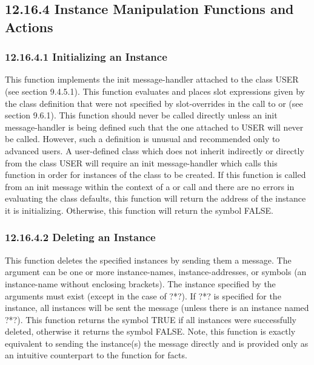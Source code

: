 \documentclass[letterpaper,10pt,english]{sphinxmanual}
\begin{document}
\subsection{12.16.4 Instance Manipulation Functions and Actions}
\label{\detokenize{actions:instance-manipulation-functions-and-actions}}

\subsubsection{12.16.4.1 Initializing an Instance}
\label{\detokenize{actions:initializing-an-instance}}
This function implements the init message-handler attached to the class
USER (see section 9.4.5.1). This function evaluates and places slot
expressions given by the class definition that were not specified by
slot-overrides in the call to  or
 (see section 9.6.1). This function should never
be called directly unless an init message-handler is being defined such
that the one attached to USER will never be called. However, such a
definition is unusual and recommended only to advanced users. A
user-defined class which does not inherit indirectly or directly from
the class USER will require an init message-handler which calls this
function in order for instances of the class to be created. If this
function is called from an init message within the context of a
 or  call and there are no
errors in evaluating the class defaults, this function will return the
address of the instance it is initializing. Otherwise, this function
will return the symbol FALSE.


\begin{sphinxVerbatim}[commandchars=\\\{\}]
\end{sphinxVerbatim}


\subsubsection{12.16.4.2 Deleting an Instance}
\label{\detokenize{actions:deleting-an-instance}}
This function deletes the specified instances by sending them a
 message. The argument can be one or more instance-names,
instance-addresses, or symbols (an instance-name without enclosing
brackets). The instance specified by the arguments must exist (except in
the case of ?*?). If ?*? is specified for the instance, all instances
will be sent the  message (unless there is an instance named
?*?). This function returns the symbol TRUE if all instances were
successfully deleted, otherwise it returns the symbol FALSE. Note, this
function is exactly equivalent to sending the instance(s) the 
message directly and is provided only as an intuitive counterpart to the
function  for facts.
\end{document}
